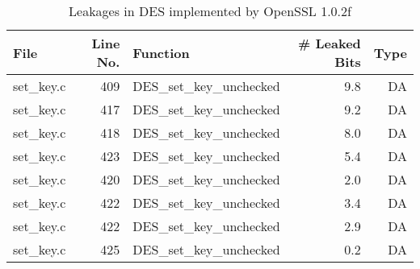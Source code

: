 \begin{table}[!ht]
\centering\tiny\scriptsize
\caption{Leakages in DES implemented by OpenSSL 1.0.2f}\label{tab:DESOpenSSL1.0.2f}
\begin{tabular}{lrlrr}
\hline
\textbf{File} & \textbf{Line No.} & \textbf{Function} & \textbf{\# Leaked Bits} & \textbf{Type} \\\hline
set\_key.c& 409&DES\_set\_key\_unchecked&9.8 &DA\\
set\_key.c& 417&DES\_set\_key\_unchecked&9.2 &DA\\
set\_key.c& 418&DES\_set\_key\_unchecked&8.0 &DA\\
set\_key.c& 423&DES\_set\_key\_unchecked&5.4 &DA\\
set\_key.c& 420&DES\_set\_key\_unchecked&2.0 &DA\\
set\_key.c& 422&DES\_set\_key\_unchecked&3.4 &DA\\
set\_key.c& 422&DES\_set\_key\_unchecked&2.9 &DA\\
set\_key.c& 425&DES\_set\_key\_unchecked&0.2 &DA\\
\hline
\end{tabular}
\renewcommand{\baselinestretch}{1.0}\selectfont
\end{table}
